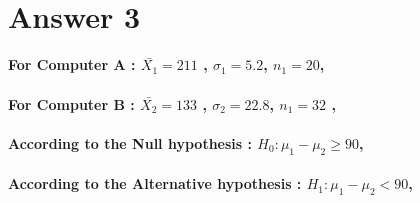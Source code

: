 \documentclass[12pt]{article}
\begin{document}
\section*{\\\\Answer 3}
\paragraph{
{\hspace*{15}}For Computer A : $\bar{X_{1}}= 211 $ , $\sigma_{1} = 5.2$, $n_{1} = 20$,
\\\\ {\hspace*{20}}For Computer B : $\bar{X_{2}}= 133 $ , $\sigma_{2} = 22.8$, $n_{1} = 32$ ,
\\\\ {\hspace*{20}}According to the Null hypothesis : $H_{0}: \mu_{1} -  \mu_{2} \geq 90 $,
\\\\ {\hspace*{20}}According to the Alternative hypothesis : $H_{1}: \mu_{1} -  \mu_{2} < 90 $,
}
\end{document}
